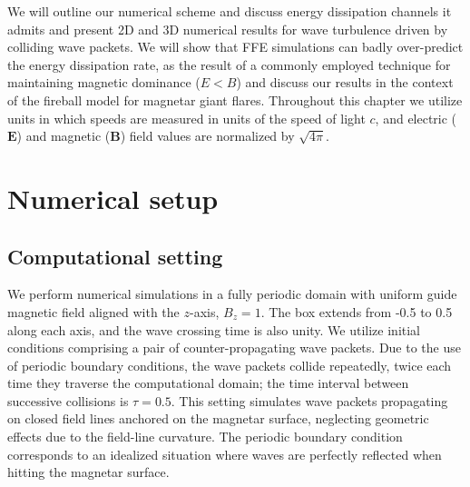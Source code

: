 We will outline our numerical scheme and discuss energy dissipation channels it admits and present 2D and 3D numerical results for \alfven wave turbulence driven by colliding wave packets. 
We will show that FFE simulations can badly over-predict the energy dissipation rate, as the result of a commonly employed technique for maintaining magnetic dominance ($E < B$) and discuss our results in the context of the fireball model for magnetar giant flares. 
Throughout this chapter we utilize units in which speeds are measured in units of the speed of light $c$, and electric ($\boldsymbol{E}$) and magnetic ($\boldsymbol{B}$) field values are normalized by $\sqrt{4 \pi}$.

\section{Numerical setup}
\subsection{Computational setting}
%
We perform numerical simulations in a fully periodic domain with uniform guide magnetic field aligned with the $z$-axis, $B_z=1$.
The box extends from -0.5 to 0.5 along each axis, and the wave crossing time is also unity.
We utilize initial conditions comprising a pair of counter-propagating \alfven wave packets.
Due to the use of periodic boundary conditions, the wave packets collide repeatedly, twice each time they traverse the computational domain; the time interval between successive collisions is $\tau = 0.5$.
This setting simulates \alfven wave packets propagating on closed field lines anchored on the magnetar surface, neglecting geometric effects due to the field-line curvature. The periodic boundary condition corresponds to an idealized situation where \alfven waves are perfectly reflected when hitting the magnetar surface.

